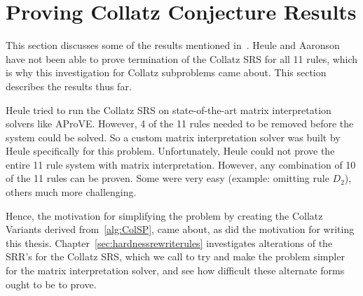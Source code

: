 \section{Proving Collatz Conjecture Results} \label{subsec:provingCollatzresults}
This section discusses some of the results mentioned in~\cite{HeuleAaronson}. Heule and Aaronson have not been able to prove termination of the Collatz SRS for all 11 rules, which is why this investigation for Collatz subproblems came about. This section describes the results thus far. \par
Heule tried to run the Collatz SRS on state-of-the-art matrix interpretation solvers like AProVE. However, 4 of the 11 rules needed to be removed before the system could be solved. So a custom matrix interpretation solver was built by Heule specifically for this problem. 
Unfortunately, Heule could not prove the entire 11 rule system with matrix interpretation. However, any combination of 10 of the 11 rules can be proven. Some were very easy (example: omitting rule $D_2$), others much more challenging.\par
Hence, the motivation for simplifying the problem by creating the Collatz Variants derived from~\ref{alg:ColSP}, came about, as did the motivation for writing this thesis. Chapter~\ref{sec:hardnessrewriterules} investigates alterations of the SRR's for the Collatz SRS, which we call  to try and make the problem simpler for the matrix interpretation solver, and see how difficult these alternate forms ought to be to prove.
